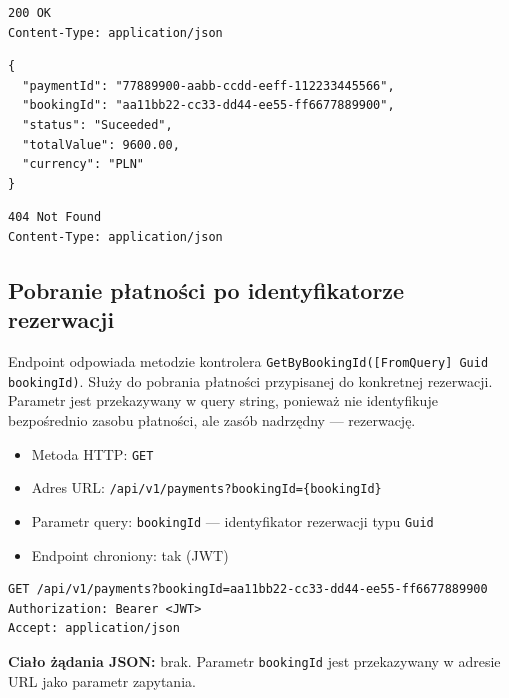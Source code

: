 \documentclass[11pt, a4paper]{article}
\begin{document}
\begin{itemize}
\begin{lstlisting}[style=http,caption={Odpowiedź HTTP — pobranie płatności po paymentId, sukces}]
200 OK
Content-Type: application/json
\end{lstlisting}

\begin{lstlisting}[style=json,caption={Ciało odpowiedzi — pobranie płatności po paymentId, sukces}]
{
  "paymentId": "77889900-aabb-ccdd-eeff-112233445566",
  "bookingId": "aa11bb22-cc33-dd44-ee55-ff6677889900",
  "status": "Suceeded",
  "totalValue": 9600.00,
  "currency": "PLN"
}
\end{lstlisting}

\begin{lstlisting}[style=http,caption={Odpowiedź HTTP — pobranie płatności po paymentId, błąd}]
404 Not Found
Content-Type: application/json
\end{lstlisting}

\subsection{Pobranie płatności po identyfikatorze rezerwacji}

Endpoint odpowiada metodzie kontrolera \texttt{GetByBookingId([FromQuery] Guid bookingId)}.
Służy do pobrania płatności przypisanej do konkretnej rezerwacji. Parametr jest
przekazywany w query string, ponieważ nie identyfikuje bezpośrednio zasobu płatności,
ale zasób nadrzędny --- rezerwację.

\begin{itemize}
    \item Metoda HTTP: \texttt{GET}
    \item Adres URL: \texttt{/api/v1/payments?bookingId=\{bookingId\}}
    \item Parametr query: \texttt{bookingId} --- identyfikator rezerwacji typu \texttt{Guid}
    \item Endpoint chroniony: tak (JWT)
\end{itemize}

\begin{lstlisting}[style=http,caption={Żądanie HTTP — pobranie płatności po bookingId}]
GET /api/v1/payments?bookingId=aa11bb22-cc33-dd44-ee55-ff6677889900
Authorization: Bearer <JWT>
Accept: application/json
\end{lstlisting}

\noindent\textbf{Ciało żądania JSON:} brak. Parametr \texttt{bookingId} jest przekazywany w adresie URL jako parametr zapytania.


\end{itemize}
\end{document}
